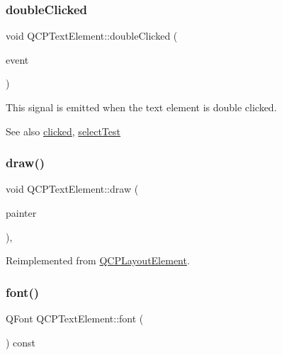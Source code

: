 \subsubsection{\texorpdfstring{doubleClicked}{doubleClicked}}
{\footnotesize\ttfamily void Q\+C\+P\+Text\+Element\+::double\+Clicked (\begin{DoxyParamCaption}\item[{Q\+Mouse\+Event $\ast$}]{event }\end{DoxyParamCaption})\hspace{0.3cm}{\ttfamily [signal]}}

This signal is emitted when the text element is double clicked.

\begin{DoxySeeAlso}{See also}
\mbox{\hyperlink{class_q_c_p_text_element_ad2246a0e701c0655623f048737298334}{clicked}}, \mbox{\hyperlink{class_q_c_p_text_element_a1e721bc2994a127ef5a8f0a514a5dbac}{select\+Test}} 
\end{DoxySeeAlso}
\mbox{\label{class_q_c_p_text_element_ad1dae61ea77ae74841f3c2fb765fc88e}} 
\subsubsection{\texorpdfstring{draw()}{draw()}}
{\footnotesize\ttfamily void Q\+C\+P\+Text\+Element\+::draw (\begin{DoxyParamCaption}\item[{\mbox{\hyperlink{class_q_c_p_painter}{Q\+C\+P\+Painter}} $\ast$}]{painter }\end{DoxyParamCaption})\hspace{0.3cm}{\ttfamily [protected]}, {\ttfamily [virtual]}}



Reimplemented from \mbox{\hyperlink{class_q_c_p_layout_element_ad1c597b1d608cfdd86e7b76819a94cfb}{Q\+C\+P\+Layout\+Element}}.

\mbox{\label{class_q_c_p_text_element_a9247189a1c2b2bf5604645a7396b2ddc}} 
\subsubsection{\texorpdfstring{font()}{font()}}
{\footnotesize\ttfamily Q\+Font Q\+C\+P\+Text\+Element\+::font (\begin{DoxyParamCaption}{ }\end{DoxyParamCaption}) const\hspace{0.3cm}{\ttfamily [inline]}}

